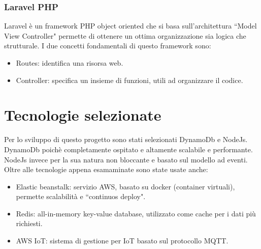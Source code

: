 \subsubsection{Laravel PHP}
Laravel è un framework PHP object oriented che si basa sull'architettura ``Model View Controller" permette di ottenere un ottima organizzazione sia logica che strutturale. I due concetti fondamentali di questo framework sono:
\begin{itemize}
	\item Routes: identifica una risorsa web.
	\item Controller: specifica un insieme di funzioni, utili ad organizzare il codice.

\end{itemize}


\section{Tecnologie selezionate}
Per lo sviluppo di questo progetto sono stati selezionati DynamoDb e NodeJs. DynamoDb poichè completamente ospitato e altamente scalabile e performante.
NodeJs invece per la sua natura non bloccante e basato sul modello ad eventi. Oltre alle tecnologie appena esamaminate sono state usate anche:


\begin{itemize}
	\item Elastic beanstalk: servizio AWS, basato su docker (container virtuali), permette scalabilità e ``continuos deploy". 
	\item Redis: all-in-memory key-value database, utilizzato come cache per i dati più richiesti.
	\item AWS IoT: sistema di gestione per IoT basato sul protocollo MQTT.

\end{itemize}